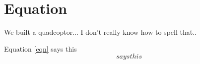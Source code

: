 \section{Equation}
We built a quadcoptor... I don't really know how to spell that.. 


Equation \ref{eqn} says this
\begin{equation}
says this
\label{eqn}
\end{equation}
